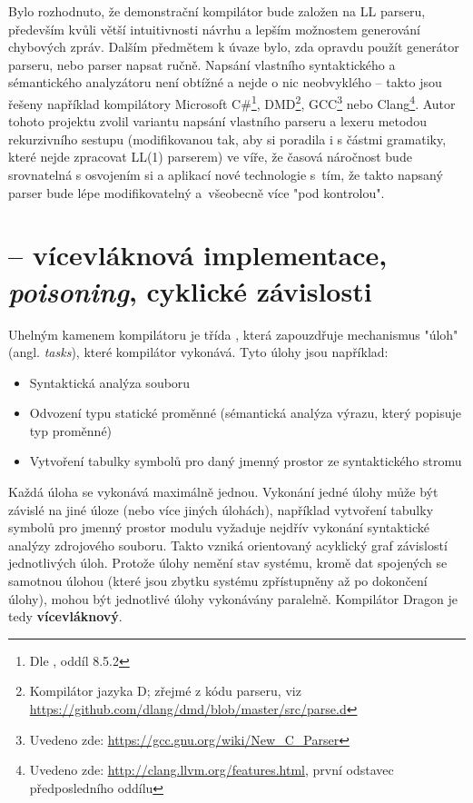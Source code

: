  Bylo rozhodnuto, že demonstrační kompilátor bude založen na LL parseru, především kvůli větší intuitivnosti návrhu a lepším možnostem generování chybových zpráv. Dalším předmětem k úvaze bylo, zda opravdu použít generátor parseru, nebo parser napsat ručně. Napsání vlastního syntaktického a sémantického analyzátoru není obtížné a nejde o nic neobvyklého -- takto jsou řešeny například kompilátory Microsoft C\#\footnote{Dle \cite{JavaCompilerConstructionCampbell}, oddíl 8.5.2}, DMD\footnote{Kompilátor jazyka D; zřejmé z kódu parseru, viz \url{https://github.com/dlang/dmd/blob/master/src/parse.d}}, GCC\footnote{Uvedeno zde: \url{https://gcc.gnu.org/wiki/New_C_Parser}} nebo Clang\footnote{Uvedeno zde: \url{http://clang.llvm.org/features.html}, první odstavec předposledního oddílu}. Autor tohoto projektu zvolil variantu napsání vlastního parseru a lexeru metodou rekurzivního sestupu (modifikovanou tak, aby si poradila i s částmi gramatiky, které nejde zpracovat LL(1) parserem) ve víře, že časová náročnost bude srovnatelná s osvojením si a aplikací nové technologie s~tím, že takto napsaný parser bude lépe modifikovatelný a~všeobecně více "pod kontrolou".
 
	\section{ -- vícevláknová implementace, \textit{poisoning}, \mbox{cyklické} \mbox{závislosti}}
Uhelným kamenem kompilátoru je třída , která zapouzdřuje mechanismus "úloh" (angl. \textit{tasks}), které kompilátor vykonává. Tyto úlohy jsou například:
\begin{itemize}
	\item Syntaktická analýza souboru
	\item Odvození typu statické proměnné (sémantická analýza výrazu, který popisuje typ proměnné)
	\item Vytvoření tabulky symbolů pro daný jmenný prostor ze syntaktického stromu
\end{itemize}

Každá úloha se vykonává maximálně jednou. Vykonání jedné úlohy může být závislé na jiné úloze (nebo více jiných úlohách), například vytvoření tabulky symbolů pro jmenný prostor modulu vyžaduje nejdřív vykonání syntaktické analýzy zdrojového souboru. Takto vzniká orientovaný acyklický graf závislostí jednotlivých úloh. Protože úlohy nemění stav systému, kromě dat spojených se samotnou úlohou (které jsou zbytku systému zpřístupněny až po dokončení úlohy), mohou být jednotlivé úlohy vykonávány paralelně. Kompilátor Dragon je tedy \textbf{vícevláknový}.

